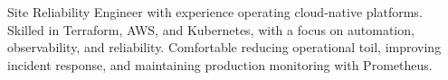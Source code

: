 \documentclass[letter,10pt]{article}
\begin{document}
Site Reliability Engineer with experience operating cloud-native platforms. Skilled in Terraform, AWS, and Kubernetes, with a focus on automation, observability, and reliability. Comfortable reducing operational toil, improving incident response, and maintaining production monitoring with Prometheus.
\end{document}
